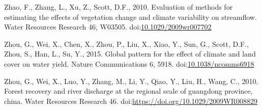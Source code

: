 \documentclass[]{elsarticle} %
\begin{document}
\leavevmode\hypertarget{ref-zhao2010}{}%
Zhao, F., Zhang, L., Xu, Z., Scott, D.F., 2010. Evaluation of methods
for estimating the effects of vegetation change and climate variability
on streamflow. Water Resources Research 46, W03505.
doi:\href{https://doi.org/10.1029/2009wr007702}{10.1029/2009wr007702}

\leavevmode\hypertarget{ref-zhou2015}{}%
Zhou, G., Wei, X., Chen, X., Zhou, P., Liu, X., Xiao, Y., Sun, G.,
Scott, D.F., Zhou, S., Han, L., Su, Y., 2015. Global pattern for the
effect of climate and land cover on water yield. Nature Communications
6, 5918.
doi:\href{https://doi.org/10.1038/ncomms6918}{10.1038/ncomms6918}

\leavevmode\hypertarget{ref-zhou2010}{}%
Zhou, G., Wei, X., Luo, Y., Zhang, M., Li, Y., Qiao, Y., Liu, H., Wang,
C., 2010. Forest recovery and river discharge at the regional scale of
guangdong province, china. Water Resources Research 46.
doi:\href{https://doi.org/https://doi.org/10.1029/2009WR008829}{https://doi.org/10.1029/2009WR008829}
\end{document}
